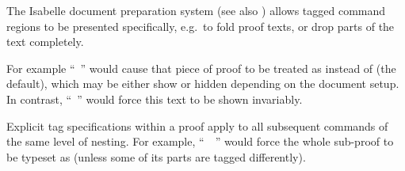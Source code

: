\begin{isabellebody}
\begin{isamarkuptext}
  \medskip The Isabelle document preparation system (see also
  \cite{isabelle-sys}) allows tagged command regions to be presented
  specifically, e.g.\ to fold proof texts, or drop parts of the text
  completely.

  For example ``~'' would
  cause that piece of proof to be treated as  instead
  of  (the default), which may be either show or hidden
  depending on the document setup.  In contrast, ``~'' would force this text to be shown
  invariably.

  Explicit tag specifications within a proof apply to all subsequent
  commands of the same level of nesting.  For example, ``~~'' would force the
  whole sub-proof to be typeset as  (unless some of its
  parts are tagged differently).%
\end{isamarkuptext}%
\isamarkuptrue%
%
\isadelimtheory
%
\endisadelimtheory
%
\isatagtheory
{}\isamarkupfalse%
%
\endisatagtheory
{\isafoldtheory}%
%
\isadelimtheory
%
\endisadelimtheory
\isanewline
\end{isabellebody}%
